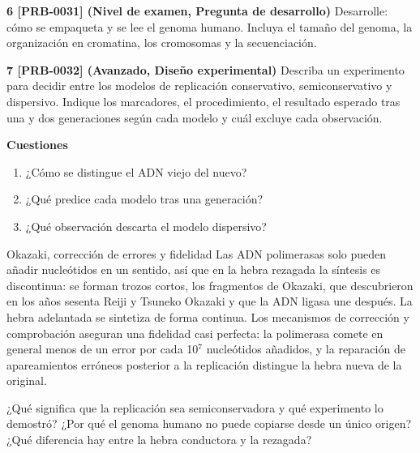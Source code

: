 \documentclass{book}
\begin{document}
\begin{tcolorbox}[title={Ejercicios}, studiumworked, breakable]
\noindent\textbf{6 [PRB-0031] (Nivel de examen, Pregunta de desarrollo)}
Desarrolle: cómo se empaqueta y se lee el genoma humano. Incluya el tamaño del genoma, la organización en cromatina, los cromosomas y la secuenciación.


\noindent\textbf{7 [PRB-0032] (Avanzado, Diseño experimental)}
Describa un experimento para decidir entre los modelos de replicación conservativo, semiconservativo y dispersivo. Indique los marcadores, el procedimiento, el resultado esperado tras una y dos generaciones según cada modelo y cuál excluye cada observación.


\noindent\textbf{Cuestiones}
\begin{enumerate}
\item ¿Cómo se distingue el ADN viejo del nuevo?
\item ¿Qué predice cada modelo tras una generación?
\item ¿Qué observación descarta el modelo dispersivo?
\end{enumerate}
\end{tcolorbox}

\begin{tcolorbox}[title={Autoficha}, studiumcheck, breakable]

Okazaki, corrección de errores y fidelidad
Las ADN polimerasas solo pueden añadir nucleótidos en un sentido, así que en la hebra rezagada la síntesis es discontinua: se forman trozos cortos, los fragmentos de Okazaki, que descubrieron en los años sesenta Reiji y Tsuneko Okazaki y que la ADN ligasa une después. La hebra adelantada se sintetiza de forma continua. Los mecanismos de corrección y comprobación aseguran una fidelidad casi perfecta: la polimerasa comete en general menos de un error por cada 10\({}^{7}\) nucleótidos añadidos, y la reparación de apareamientos erróneos posterior a la replicación distingue la hebra nueva de la original.


¿Qué significa que la replicación sea semiconservadora y qué experimento lo demostró? ¿Por qué el genoma humano no puede copiarse desde un único origen? ¿Qué diferencia hay entre la hebra conductora y la rezagada?

\end{tcolorbox}
\end{document}
